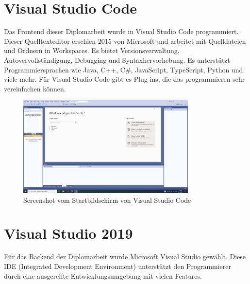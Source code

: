 \section{Visual Studio Code}
Das Frontend dieser Diplomarbeit wurde in Visual Studio Code programmiert. Dieser Quelltexteditor erschien 2015 von Microsoft und arbeitet mit Quelldateien und Ordnern in Workspaces. Es bietet Versionsverwaltung, Autovervollständigung, Debugging und Syntaxhervorhebung. Es unterstützt Programmiersprachen wie Java, C++, C\#, JavaScript, TypeScript, Python und viele mehr. Für Visual Studio Code gibt es Plug-ins, die das programmieren sehr vereinfachen können. \autocite{wikiVisualStudioCode}

\begin{figure}[H]
	\centerline{
		\includegraphics[width=0.8\textwidth]{./grafiken/visual_studio_startview.png}
	}
	\vskip0pt
	\caption{Screenshot vom Startbildschirm von Visual Studio Code} \label{fig:visualStudioCodeStartview}
\end{figure}

\section{Visual Studio 2019}

Für das Backend der Diplomarbeit wurde Microsoft Visual Studio gewählt. Diese IDE (Integrated Development Environment) unterstützt den Programmierer durch eine ausgereifte Entwicklungsumgebung mit vielen Features.\\

